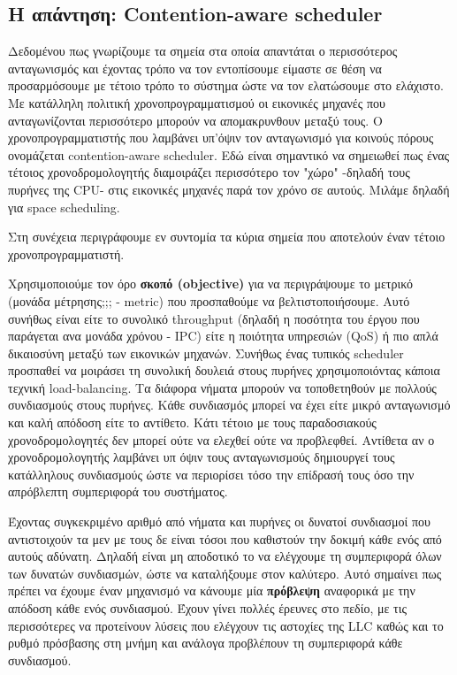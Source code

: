 \subsection{Η απάντηση: Contention-aware scheduler}
Δεδομένου πως γνωρίζουμε τα σημεία στα οποία απαντάται ο περισσότερος
ανταγωνισμός και έχοντας τρόπο να τον εντοπίσουμε είμαστε σε θέση να
προσαρμόσουμε με τέτοιο τρόπο το σύστημα ώστε να τον ελατώσουμε στο ελάχιστο. Με
κατάλληλη πολιτική χρονοπρογραμματισμού οι εικονικές μηχανές που ανταγωνίζονται
περισσότερο μπορούν να απομακρυνθουν μεταξύ τους. Ο χρονοπρογραμματιστής που
λαμβάνει υπ'όψιν τον ανταγωνισμό για κοινούς πόρους ονομάζεται contention-aware
scheduler. Εδώ είναι σημαντικό να σημειωθεί πως ένας τέτοιος χρονοδρομολογητής
διαμοιράζει περισσότερο τον "χώρο" -δηλαδή τους πυρήνες της CPU- στις εικονικές
μηχανές παρά τον χρόνο σε αυτούς. Μιλάμε δηλαδή για space scheduling.

Στη συνέχεια περιγράφουμε εν συντομία τα κύρια σημεία που αποτελούν έναν τέτοιο
χρονοπρογραμματιστή.

Χρησιμοποιούμε τον όρο \textbf{σκοπό (objective)} για να περιγράψουμε το μετρικό (μονάδα
μέτρησης;;; - metric) που προσπαθούμε να βελτιστοποιήσουμε. Αυτό συνήθως είναι
είτε το συνολικό throughput (δηλαδή η ποσότητα του έργου που παράγεται ανα
μονάδα χρόνου - IPC) είτε η ποιότητα υπηρεσιών (QoS) ή πιο απλά δικαιοσύνη
μεταξύ των εικονικών μηχανών. Συνήθως ένας τυπικός scheduler προσπαθεί να
μοιράσει τη συνολική δουλειά στους πυρήνες χρησιμοποιόντας κάποια τεχνική
load-balancing. Τα διάφορα νήματα μπορούν να τοποθετηθούν με πολλούς συνδιασμούς
στους πυρήνες. Κάθε συνδιασμός μπορεί να έχει είτε μικρό ανταγωνισμό και καλή
απόδοση είτε το αντίθετο. Κάτι τέτοιο με τους παραδοσιακούς χρονοδρομολογητές δεν
μπορεί ούτε να ελεχθεί ούτε να προβλεφθεί. Αντίθετα αν ο χρονοδρομολογητής
λαμβάνει υπ όψιν τους ανταγωνισμούς δημιουργεί τους κατάλληλους συνδιασμούς ώστε
να περιορίσει τόσο την επίδρασή τους όσο την απρόβλεπτη συμπεριφορά του
συστήματος.

Έχοντας συγκεκριμένο αριθμό από νήματα και πυρήνες οι δυνατοί συνδιασμοί που
αντιστοιχούν τα μεν με τους δε είναι τόσοι που καθιστούν την δοκιμή κάθε ενός
από αυτούς αδύνατη. Δηλαδή είναι μη αποδοτικό το να ελέγχουμε τη συμπεριφορά
όλων των δυνατών συνδιασμών, ώστε να καταλήξουμε στον καλύτερο. Αυτό σημαίνει
πως πρέπει να έχουμε έναν μηχανισμό να κάνουμε μία \textbf{πρόβλεψη} αναφορικά
με την απόδοση κάθε ενός συνδιασμού. Έχουν γίνει πολλές έρευνες στο πεδίο, με
τις περισσότερες να προτείνουν λύσεις που ελέγχουν τις αστοχίες της LLC καθώς
και το ρυθμό πρόσβασης στη μνήμη και ανάλογα προβλέπουν τη συμπεριφορά κάθε
συνδιασμού.

